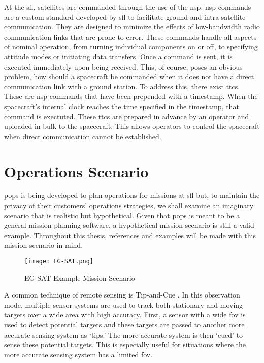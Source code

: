 At the \gls{sfl}, satellites are commanded through the use of the \gls{nsp}.
\gls{nsp} commands are a custom standard developed by \gls{sfl} to facilitate
ground and intra-satellite communication. They are designed to minimize the
effects of low-bandwidth radio communication links that are prone to error.
These commands handle all aspects of nominal operation, from turning individual
components on or off, to specifying attitude modes or initiating data
transfers. Once a command is sent, it is executed immediately upon being
received. This, of course, poses an obvious problem, how should a spacecraft be
commanded when it does not have a direct communication link with a ground
station. To address this, there exist \glspl{ttc}. These are \gls{nsp} commands
that have been prepended with a timestamp. When the spacecraft's internal clock
reaches the time specified in the timestamp, that command is exectuted. These
\glspl{ttc} are prepared in advance by an operator and uploaded in bulk to the
spacecraft. This allows operators to control the spacecraft when direct
communication cannot be established.

\section{Operations Scenario}

\gls{pops} is being developed to plan operations for missions at \gls{sfl} but,
to maintain the privacy of their customers' operations strategies, we shall
examine an imaginary scenario that is realistic but hypothetical. Given that
\gls{pops} is meant to be a general mission planning software, a hypothetical
mission scenario is still a valid example. Throughout this thesis, references
and examples will be made with this mission scenario in mind.

\begin{figure}[h]
    \centering
    \texttt{[image: EG-SAT.png]} 
    \caption{EG-SAT Example Mission Scenario}
    \label{fig:eg-sat-1} 
\end{figure}

A common technique of remote sensing is Tip-and-Cue \cite{}.  In this
observation mode, multiple sensor systems are used to track both stationary and
moving targets over a wide area with high accuracy. First, a sensor with a wide
\gls{fov} is used to detect potential targets and these targets are passed to
another more accurate sensing system as ‘tips.’ The more accurate system is
then ‘cued’ to sense these potential targets. This is especially useful for
situations where the more accurate sensing system has a limited \gls{fov}.

